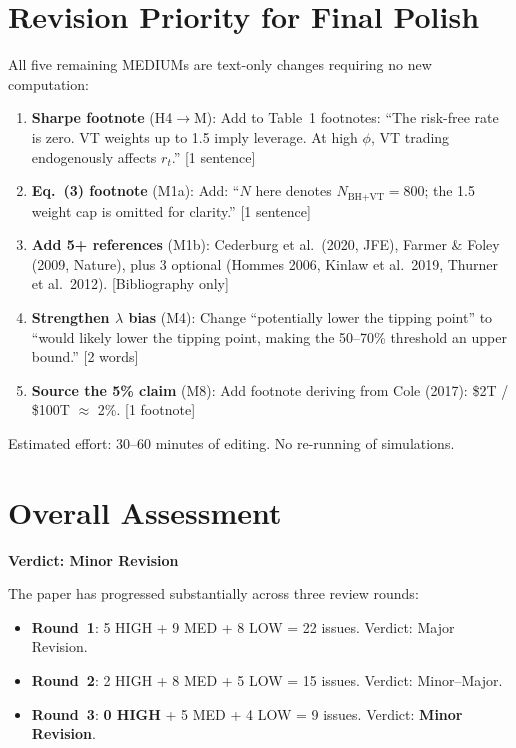 \documentclass[12pt,a4paper]{article}
\begin{document}
\section*{Revision Priority for Final Polish}

All five remaining MEDIUMs are text-only changes requiring no new computation:

\begin{enumerate}
  \item \textbf{Sharpe footnote} (H4$\to$M): Add to Table~1 footnotes: ``The risk-free rate is zero. VT weights up to 1.5 imply leverage. At high $\phi$, VT trading endogenously affects $r_t$.'' [1 sentence]
  \item \textbf{Eq.~(3) footnote} (M1a): Add: ``$N$ here denotes $N_{\text{BH+VT}} = 800$; the 1.5 weight cap is omitted for clarity.'' [1 sentence]
  \item \textbf{Add 5+ references} (M1b): Cederburg et al.\ (2020, JFE), Farmer \& Foley (2009, Nature), plus 3 optional (Hommes 2006, Kinlaw et al.\ 2019, Thurner et al.\ 2012). [Bibliography only]
  \item \textbf{Strengthen $\lambda$ bias} (M4): Change ``potentially lower the tipping point'' to ``would likely lower the tipping point, making the 50--70\% threshold an upper bound.'' [2 words]
  \item \textbf{Source the 5\% claim} (M8): Add footnote deriving from Cole (2017): \$2T / \$100T $\approx$ 2\%. [1 footnote]
\end{enumerate}

\noindent Estimated effort: 30--60 minutes of editing. No re-running of simulations.


\section*{Overall Assessment}

\textbf{Verdict: Minor Revision}

The paper has progressed substantially across three review rounds:
\begin{itemize}[nosep]
  \item \textbf{Round~1}: 5 HIGH + 9 MED + 8 LOW = 22 issues. Verdict: Major Revision.
  \item \textbf{Round~2}: 2 HIGH + 8 MED + 5 LOW = 15 issues. Verdict: Minor--Major.
  \item \textbf{Round~3}: \textbf{0 HIGH} + 5 MED + 4 LOW = 9 issues. Verdict: \textbf{Minor Revision}.
\end{itemize}
\end{document}
